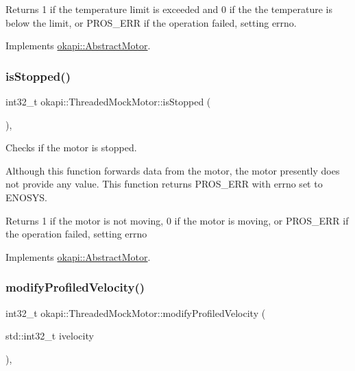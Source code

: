 \begin{DoxyReturn}{Returns}
1 if the temperature limit is exceeded and 0 if the the temperature is below the limit, or P\+R\+O\+S\+\_\+\+E\+RR if the operation failed, setting errno. 
\end{DoxyReturn}


Implements \mbox{\hyperlink{classokapi_1_1AbstractMotor_a61e24db43d1fe790b173cc0b4e27922f}{okapi\+::\+Abstract\+Motor}}.

\mbox{\label{classokapi_1_1ThreadedMockMotor_ab60dbb6cb9d68196eb801aaa3cea1da8}} 
\subsubsection{\texorpdfstring{isStopped()}{isStopped()}}
{\footnotesize\ttfamily int32\+\_\+t okapi\+::\+Threaded\+Mock\+Motor\+::is\+Stopped (\begin{DoxyParamCaption}{ }\end{DoxyParamCaption})\hspace{0.3cm}{\ttfamily [override]}, {\ttfamily [virtual]}}



Checks if the motor is stopped. 

Although this function forwards data from the motor, the motor presently does not provide any value. This function returns P\+R\+O\+S\+\_\+\+E\+RR with errno set to E\+N\+O\+S\+YS.

\begin{DoxyReturn}{Returns}
1 if the motor is not moving, 0 if the motor is moving, or P\+R\+O\+S\+\_\+\+E\+RR if the operation failed, setting errno 
\end{DoxyReturn}


Implements \mbox{\hyperlink{classokapi_1_1AbstractMotor_aa46c96a6eec7921ad5b12fcd4119358e}{okapi\+::\+Abstract\+Motor}}.

\mbox{\label{classokapi_1_1ThreadedMockMotor_a84e066f57201b2d2c8e54d5782d79b68}} 
\subsubsection{\texorpdfstring{modifyProfiledVelocity()}{modifyProfiledVelocity()}}
{\footnotesize\ttfamily int32\+\_\+t okapi\+::\+Threaded\+Mock\+Motor\+::modify\+Profiled\+Velocity (\begin{DoxyParamCaption}\item[{std\+::int32\+\_\+t}]{ivelocity }\end{DoxyParamCaption})\hspace{0.3cm}{\ttfamily [override]}, {\ttfamily [virtual]}}



